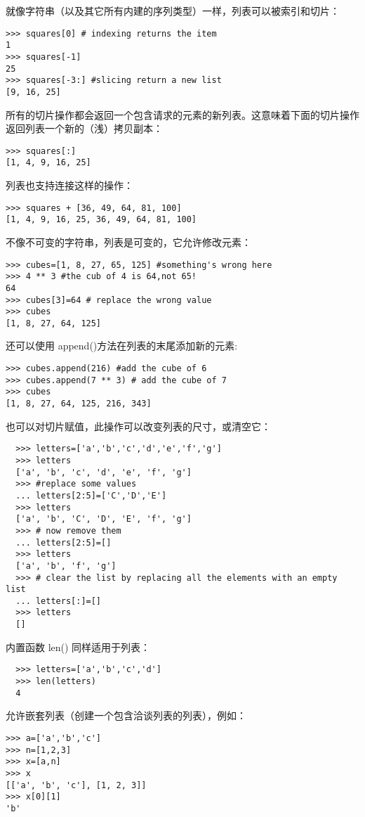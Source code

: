 \documentclass[UTF8]{ctexart}
\begin{document}
就像字符串（以及其它所有内建的序列类型）一样，列表可以被索引和切片：
\begin{verbatim}
>>> squares[0] # indexing returns the item
1
>>> squares[-1]
25
>>> squares[-3:] #slicing return a new list
[9, 16, 25]
\end{verbatim}

所有的切片操作都会返回一个包含请求的元素的新列表。这意味着下面的切片操作返回列表一个新的（浅）拷贝副本：
\begin{verbatim}
>>> squares[:]
[1, 4, 9, 16, 25]
\end{verbatim}

列表也支持连接这样的操作：
\begin{verbatim}
>>> squares + [36, 49, 64, 81, 100]
[1, 4, 9, 16, 25, 36, 49, 64, 81, 100]
\end{verbatim}

不像不可变的字符串，列表是可变的，它允许修改元素：
\begin{verbatim}
>>> cubes=[1, 8, 27, 65, 125] #something's wrong here
>>> 4 ** 3 #the cub of 4 is 64,not 65!
64
>>> cubes[3]=64 # replace the wrong value
>>> cubes
[1, 8, 27, 64, 125]
\end{verbatim}

还可以使用 append()方法在列表的末尾添加新的元素:
\begin{verbatim}
>>> cubes.append(216) #add the cube of 6
>>> cubes.append(7 ** 3) # add the cube of 7
>>> cubes
[1, 8, 27, 64, 125, 216, 343]
\end{verbatim}

也可以对切片赋值，此操作可以改变列表的尺寸，或清空它：
\begin{verbatim}
  >>> letters=['a','b','c','d','e','f','g']
  >>> letters
  ['a', 'b', 'c', 'd', 'e', 'f', 'g']
  >>> #replace some values
  ... letters[2:5]=['C','D','E']
  >>> letters
  ['a', 'b', 'C', 'D', 'E', 'f', 'g']
  >>> # now remove them
  ... letters[2:5]=[]
  >>> letters
  ['a', 'b', 'f', 'g']
  >>> # clear the list by replacing all the elements with an empty list
  ... letters[:]=[]
  >>> letters
  []
\end{verbatim}

内置函数 len() 同样适用于列表：
\begin{verbatim}
  >>> letters=['a','b','c','d']
  >>> len(letters)
  4
\end{verbatim}

允许嵌套列表（创建一个包含洽谈列表的列表），例如：
\begin{verbatim}
>>> a=['a','b','c']
>>> n=[1,2,3]
>>> x=[a,n]
>>> x
[['a', 'b', 'c'], [1, 2, 3]]
>>> x[0][1]
'b'
\end{verbatim}
\end{document}
